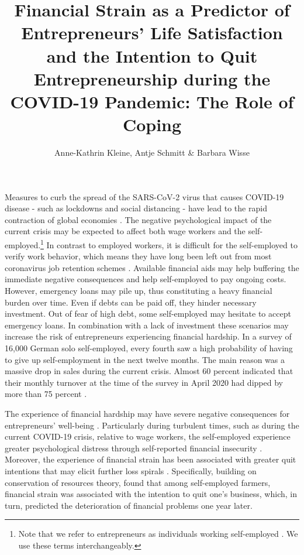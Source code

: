 \documentclass[man]{apa7}
\title{Financial Strain as a Predictor of Entrepreneurs' Life Satisfaction and the Intention to Quit Entrepreneurship during the COVID-19 Pandemic: The Role of Coping}
\author{Anne-Kathrin Kleine, Antje Schmitt \& Barbara Wisse}
\affiliation{University of Groningen}
\begin{document}
\maketitle

Measures to curb the spread of the SARS-CoV-2 virus that causes COVID-19 disease - such as lockdowns and social distancing - have lead to the rapid contraction of global economies \parencite[e.g.,][]{Brown2020, Thorgren2020}. 
The negative psychological impact of the current crisis may be expected to affect both wage workers and the self-employed.\footnote{Note that we refer to entrepreneurs as individuals working self-employed \parencite[see, e.g.,][]{Gorgievski2016a}. We use these terms interchangeably.}
In contrast to employed workers, it is difficult for the self-employed to verify work behavior, which means they have long been left out from most coronavirus job retention schemes \parencite{Blundell2020, Bertschek2020}.
Available financial aids may help buffering the immediate negative consequences and help self-employed to pay ongoing costs. 
However, emergency loans may pile up, thus constituting a heavy financial burden over time. 
Even if debts can be paid off, they hinder necessary investment. 
Out of fear of high debt, some self-employed may hesitate to accept emergency loans.
In combination with a lack of investment these scenarios may increase the risk of entrepreneurs experiencing financial hardship. 
In a survey of 16,000 German solo self-employed, every fourth saw a high probability of having to give up self-employment in the next twelve months. 
The main reason was a massive drop in sales during the current crisis. 
Almost 60 percent indicated that their monthly turnover at the time of the survey in April 2020 had dipped by more than 75 percent \parencite{Bertschek2020}. \par 

The experience of financial hardship may have severe negative consequences for entrepreneurs' well-being \parencite[e.g.,][]{Annink2016a}. 
Particularly during turbulent times, such as during the current COVID-19 crisis, relative to wage workers, the self-employed experience greater psychological distress through self-reported financial insecurity \parencite{Patel2020a}.
Moreover, the experience of financial strain has been associated with greater quit intentions that may elicit further loss spirals \parencite{Gorgievski2010a}.
Specifically, building on conservation of resources theory, \textcite{Gorgievski2010a} found that among self-employed farmers, financial strain was associated with the intention to quit one's business, which, in turn, predicted the deterioration of financial problems one year later. \par 
\end{document}
